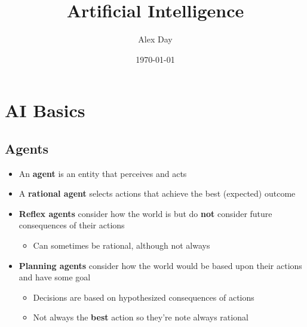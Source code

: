 \documentclass[11pt]{article}
\author{Alex Day}
\date{\today}
\title{Artificial Intelligence}
\begin{document}
\maketitle
\tableofcontents


\section{AI Basics}
\label{sec:org63f78e3}
\subsection{Agents}
\label{sec:org9482631}
\begin{itemize}
\item An \textbf{agent} is an entity that perceives and acts
\item A \textbf{rational agent} selects actions that achieve the best (expected) outcome
\item \textbf{Reflex agents} consider how the world is but do \textbf{\textbf{not}} consider future consequences of their actions
\begin{itemize}
\item Can sometimes be rational, although not always
\end{itemize}
\item \textbf{Planning agents} consider how the world would be based upon their actions and have some goal
\begin{itemize}
\item Decisions are based on hypothesized consequences of actions
\item Not always the \textbf{\textbf{best}} action so they're note always rational
\end{itemize}
\end{itemize}
\end{document}
